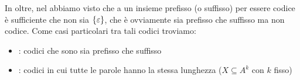 In oltre, nel  abbiamo visto che a un insieme prefisso (o suffisso) per essere codice è sufficiente che non sia \(\set{\varepsilon}\), che è ovviamente sia prefisso che suffisso ma non codice.
Come casi particolari tra tali codici troviamo:
\begin{itemize}
  \item {}: codici che sono sia prefisso che suffisso
  \item {}: codici in cui tutte le parole hanno la stessa lunghezza (\(X \subseteq A^k\) con \(k\) fisso)
\end{itemize}